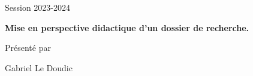 \documentclass[french, 10pt]{article}
\begin{document}


\begin{center}
\LARGE{}\medskip

 \LARGE{}\medskip

\large{Session 2023-2024}\bigskip

\textbf{\LARGE{\textcolor{cobalt}{Mise en perspective didactique d'un dossier de recherche.}}}\bigskip

Présenté par \vspace{.5cm}

  \Large{Gabriel Le Doudic}\medskip
\end{center}

\end{document}
